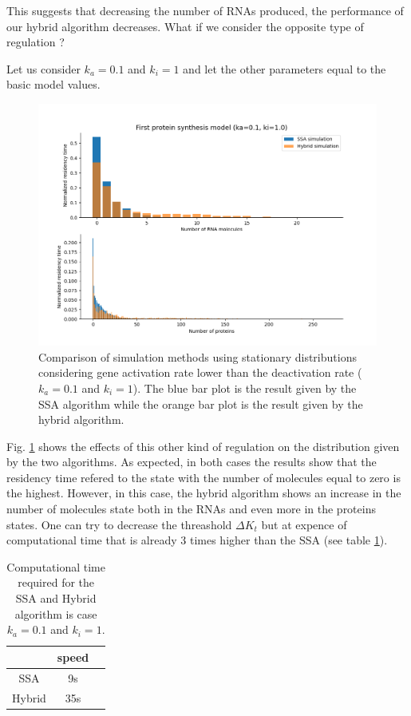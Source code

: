 \documentclass[12pt,a4paper]{report}
\begin{document}
This suggests that decreasing the number of RNAs produced, the performance of our hybrid algorithm decreases. What if we consider the opposite type of regulation ? 

Let us consider $k_{a}=0.1$ and $k_{i}=1$ and let the other parameters equal to the basic model values.

\begin{figure}[!ht]
\centering
\includegraphics[scale=0.70]{ka0.1ki1SSA9sHybrid35stimelimit14000.png}
\caption{Comparison of simulation methods using stationary distributions considering gene activation rate lower than the deactivation rate ($k_{a}=0.1$ and $k_{i}=1$). The blue bar plot is the result given by the SSA algorithm while the orange bar plot is the result given by the hybrid algorithm.}
\label{SSAHybridka0.1ki1}
\end{figure}

Fig. \ref{SSAHybridka0.1ki1} shows the effects of this other kind of regulation on the distribution given by the two algorithms. As expected, in both cases the results show that the residency time refered to the state with the number of molecules equal to zero is the highest. However, in this case, the hybrid algorithm shows an increase in the number of molecules state both in the RNAs and even more in the proteins states. One can try to decrease the threashold $\Delta K_{t}$ but at expence of computational time that is already 3 times higher than the SSA (see table \ref{ka0.1ki1}).

\begin{table}
\begin{center}
\begin{tabular}{ |c|c|c| } 
 \hline
       & \textbf{speed} \\
 \hline
 SSA & 9s \\
 \hline
 Hybrid & 35s \\ 
 \hline
\end{tabular}
\caption{\label{ka0.1ki1}Computational time required for the SSA and Hybrid algorithm is case $k_{a}=0.1$ and $k_{i}=1$.}
\end{center}
\end{table}
\end{document}
